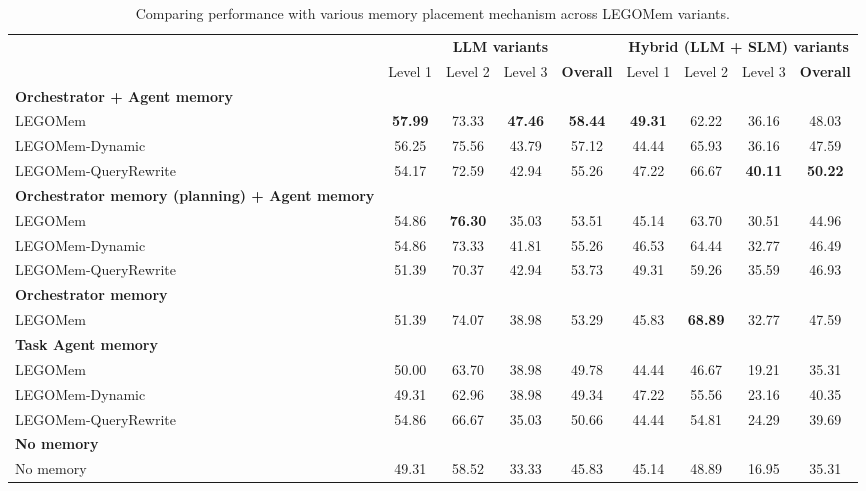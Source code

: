 \documentclass[sigconf]{aamas}
\newcommand{\legomem}{LEGOMem}
\newcommand{\dynalegomem}{LEGOMem-Dynamic}
\newcommand{\queryrewritelegomem}{LEGOMem-QueryRewrite}
\begin{document}
\begin{table}[t]
\centering
\caption{Comparing performance with various memory placement mechanism across \legomem{} variants.}
\label{tab:memory_placement}
\begin{tabular}{lcccccccc}
\toprule
 & \multicolumn{4}{c}{\textbf{LLM variants}} & \multicolumn{4}{c}{\textbf{Hybrid (LLM + SLM) variants}} \\
 & Level 1 & Level 2 & Level 3 & \textbf{Overall} & Level 1 & Level 2 & Level 3 & \textbf{Overall}\\
\midrule
\rowcolor{gray!20}
\textbf{Orchestrator + Agent memory} & & & & & & & & \\
\legomem{} & \textbf{57.99} & 73.33 & \textbf{47.46} & \textbf{58.44} & \textbf{49.31} & 62.22  & 36.16 & 48.03 \\
\dynalegomem{} & 56.25 & 75.56 & 43.79 & 57.12 & 44.44 & 65.93  & 36.16 & 47.59 \\
\queryrewritelegomem{} & 54.17 & 72.59 & 42.94 & 55.26 & 47.22 & 66.67 & \textbf{40.11} & \textbf{50.22}  \\
\rowcolor{gray!20}
\textbf{Orchestrator memory (planning) + Agent memory} & & & & & & & & \\
\legomem{} &  54.86 & \textbf{76.30}  & 35.03 & 53.51 & 45.14 & 63.70 & 30.51  & 44.96 \\
\dynalegomem{} &  54.86 & 73.33 & 41.81 & 55.26 & 46.53 & 64.44 & 32.77  & 46.49  \\
\queryrewritelegomem{} &  51.39 & 70.37  & 42.94 & 53.73 & 49.31 & 59.26 & 35.59  & 46.93 \\
\rowcolor{gray!20}
\textbf{Orchestrator memory} & & & & & & & & \\
\legomem{} &  51.39 & 74.07 & 38.98 & 53.29 & 45.83 & \textbf{68.89} & 32.77  & 47.59 \\
\rowcolor{gray!20}
\textbf{Task Agent memory} & & & & & & & & \\
\legomem{} & 50.00 & 63.70 & 38.98 & 49.78 & 44.44 & 46.67  & 19.21 & 35.31 \\
\dynalegomem{} &  49.31 & 62.96  & 38.98 & 49.34 & 47.22 & 55.56 & 23.16 & 40.35 \\
\queryrewritelegomem{} &  54.86 & 66.67  & 35.03 & 50.66 & 44.44 & 54.81 & 24.29  & 39.69 \\
\rowcolor{gray!20}
\textbf{No memory} & & & & & & & & \\
No memory & 49.31 & 58.52 & 33.33 & 45.83 & 45.14 & 48.89  & 16.95 & 35.31 \\
\bottomrule
\end{tabular}
\end{table}
\end{document}
